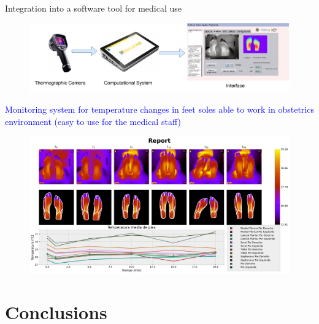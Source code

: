 \documentclass[aspectratio=169]{beamer}
\begin{document}
\begin{frame}[allowframebreaks]{Integration into a software tool for medical use}
\begin{figure}
        \centering
        \includegraphics[width=0.98\linewidth]{Figures/system.pdf}
\end{figure}

\begin{center}
\textcolor{blue}{Monitoring system for temperature changes in feet soles able to work in obstetrics environment (easy to use for the medical staff)}
    
\end{center}
\begin{center}
    
\end{center}
\framebreak
\begin{figure}
        \centering
        \includegraphics[width=0.87\linewidth]{Figures/report.pdf}
\end{figure}
    
\end{frame}



\section{Conclusions}
\end{document}
